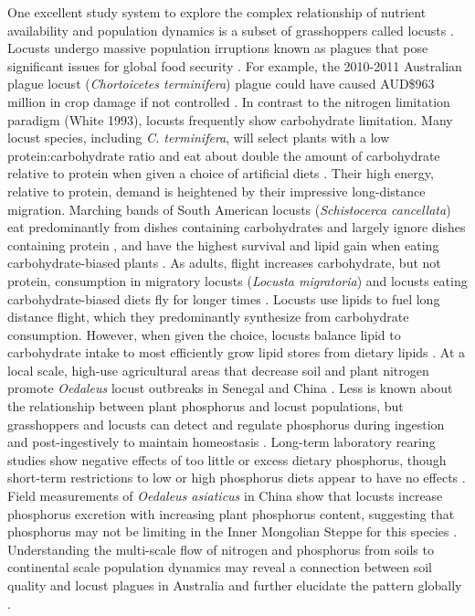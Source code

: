 \documentclass[
]{article}
\begin{document}
One excellent study system to explore the complex relationship of
nutrient availability and population dynamics is a subset of
grasshoppers called locusts
\citep{cullen_molecules_2017, uvarov_grasshoppers_1977}. Locusts undergo
massive population irruptions known as plagues that pose significant
issues for global food security \citep{cease_living_2015}. For example,
the 2010-2011 Australian plague locust (\emph{Chortoicetes terminifera})
plague could have caused AUD\$963 million in crop damage if not
controlled \citep{millist_nicola_benefitcost_nodate}. In contrast to the
nitrogen limitation paradigm (White 1993), locusts frequently show
carbohydrate limitation. Many locust species, including \emph{C.
terminifera}, will select plants with a low protein:carbohydrate ratio
and eat about double the amount of carbohydrate relative to protein when
given a choice of artificial diets
\citep{behmer_insect_2009, brosemann_nutrient_2023, lawton_mismatched_2021, le_gall_global_2019}.
Their high energy, relative to protein, demand is heightened by their
impressive long-distance migration. Marching bands of South American
locusts (\emph{Schistocerca cancellata}) eat predominantly from dishes
containing carbohydrates and largely ignore dishes containing protein
\citep{cease_field_2023}, and have the highest survival and lipid gain
when eating carbohydrate-biased plants \citep{talal_plant_2020}. As
adults, flight increases carbohydrate, but not protein, consumption in
migratory locusts (\emph{Locusta migratoria}) and locusts eating
carbohydrate-biased diets fly for longer times \citep{talal_body_2023}.
Locusts use lipids to fuel long distance flight, which they
predominantly synthesize from carbohydrate consumption. However, when
given the choice, locusts balance lipid to carbohydrate intake to most
efficiently grow lipid stores from dietary lipids
\citep{talal_target_2024}. At a local scale, high-use agricultural areas
that decrease soil and plant nitrogen promote \emph{Oedaleus} locust
outbreaks in Senegal and China
\citep{cease_heavy_2012, giese_n_2013, le_gall_global_2019, word_soil-targeted_2019}.
Less is known about the relationship between plant phosphorus and locust
populations, but grasshoppers and locusts can detect and regulate
phosphorus during ingestion and post-ingestively to maintain homeostasis
\citep{cease_dietary_2016, zhang_grasshoppers_2014}. Long-term
laboratory rearing studies show negative effects of too little or excess
dietary phosphorus, though short-term restrictions to low or high
phosphorus diets appear to have no effects \citep{cease_dietary_2016}.
Field measurements of \emph{Oedaleus asiaticus} in China show that
locusts increase phosphorus excretion with increasing plant phosphorus
content, suggesting that phosphorus may not be limiting in the Inner
Mongolian Steppe for this species \citep{zhang_grasshoppers_2014}.
Understanding the multi-scale flow of nitrogen and phosphorus from soils
to continental scale population dynamics may reveal a connection between
soil quality and locust plagues in Australia and further elucidate the
pattern globally \citep{cease_how_2024, le_gall_global_2019}.
\end{document}

